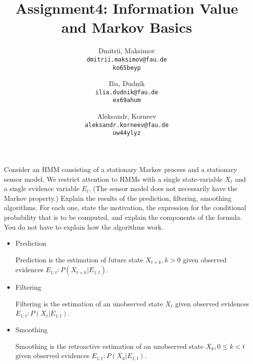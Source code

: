 \documentclass{homework}
\title{Assignment4: Information Value and Markov Basics}
\author{
  Dmitrii, Maksimov\\
  \texttt{dmitrii.maksimov@fau.de} \\
  \texttt{ko65beyp}
  \and
  Ilia, Dudnik\\
  \texttt{ilia.dudnik@fau.de}\\
  \texttt{ex69ahum}
  \and
  Aleksandr, Korneev\\
  \texttt{aleksandr.korneev@fau.de}\\
  \texttt{uw44ylyz}
}
\begin{document}
\maketitle

Consider an HMM consisting of a stationary Markov process and a stationary sensor model. We restrict attention to HMMs with a single state-variable $X_t$ and a single evidence variable $E_t$. (The sensor model does not necessarily have the Markov property.)
Explain the results of the prediction, filtering, smoothing algorithms. For each one, state the motivation, the expression for the conditional probability that is to be computed, and explain the components of the formula. You do not have to explain how the algorithms work.
\begin{itemize}
	\item Prediction

	Prediction is the estimation of future state $X_{t+k}, k>0$ given observed evidences $E_{1:t}: P(X_{t+k}|E_{1:t})$.
	\item Filtering

	Filtering is the estimation of an unobserved state $X_t$ given observed evidences $E_{1:t}: P(X_t|E_{1:t})$.

	\item Smoothing

	Smoothing is the retroactive estimation of an unobserved state $X_k, 0\leq k<t$ given observed evidences $E_{1:t}: P(X_k|E_{1:t})$.
\end{itemize}
\end{document}

